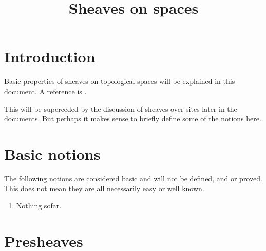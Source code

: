 

%


\title{Sheaves on spaces}


\maketitle

\tableofcontents

\section{Introduction}
\label{section-introduction}

\noindent
Basic properties of sheaves on topological spaces
will be explained in this document.
A reference is \cite{Godement}.

\medskip\noindent
This will be superceded by the discussion of sheaves
over sites later in the documents. But perhaps it makes 
sense to briefly define some of the notions here.











\section{Basic notions}
\label{section-sheaves-basic}

\noindent
The following notions are considered basic and will not be defined,
and or proved. This does not mean they are all necessarily easy or 
well known.

\begin{enumerate}
\item Nothing sofar.
\end{enumerate}












\section{Presheaves}
\label{section-presheaves}


